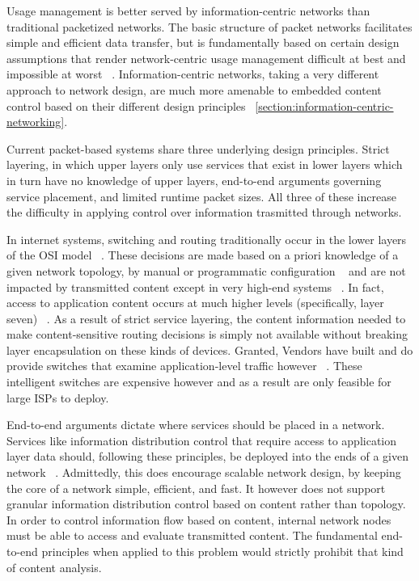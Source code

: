 \label{section:capabilities}
Usage management is better served by information-centric networks than traditional packetized networks.  The basic structure of packet networks facilitates simple and efficient data transfer, but is fundamentally based on certain design assumptions that render network-centric usage management difficult at best and impossible at worst ~\cite{Cl:88,SaReCl:84}.  Information-centric networks, taking a very different approach to network design, are much more amenable to embedded content control based on their different design principles ~\ref{section:information-centric-networking}.

Current packet-based systems share three underlying design principles.  Strict layering, in which upper layers only use services that exist in lower layers which in turn have no knowledge of upper layers, end-to-end arguments governing service placement, and limited runtime packet sizes.  All three of these increase the difficulty in applying control over information trasmitted through networks.

In internet systems, switching and routing traditionally occur in the lower layers of the OSI model ~\cite{Tanenbaum:1985:CN:536716}.  These decisions are made based on a priori knowledge of a given network topology, by manual or programmatic configuration ~\cite{proposal:openflow} and are not impacted by transmitted content except in very high-end systems ~\cite{cisco-6500}.  In fact, access to application content occurs at much higher levels (specifically, layer seven) ~\cite{Tanenbaum:1985:CN:536716}.  As a result of strict service layering, the content information needed to make content-sensitive routing decisions is simply not available without breaking layer encapsulation on these kinds of devices.  Granted, Vendors have built and do provide switches that examine application-level traffic however ~\cite{cisco-6500}.  These intelligent switches are expensive however and as a result are only feasible for large ISPs to deploy. 

End-to-end arguments dictate where services should be placed in a network.  Services like information distribution control that require access to application layer data should, following these principles, be deployed into the ends of a given network ~\cite{SaReCl:84}.  Admittedly, this does encourage scalable network design, by keeping the core of a network simple, efficient, and fast. It however does not support granular information distribution control based on content rather than topology.  In order to control information flow based on content, internal network nodes must be able to access and evaluate transmitted content.  The fundamental end-to-end principles when applied to this problem would strictly prohibit that kind of content analysis.

